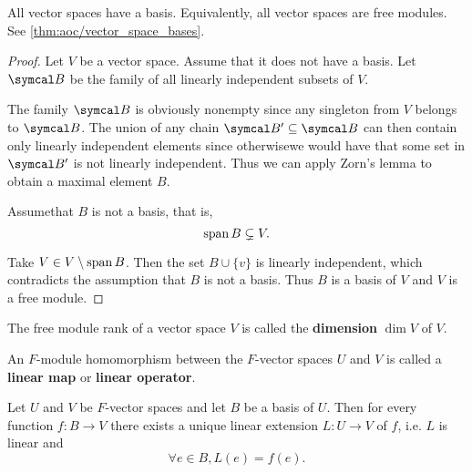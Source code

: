 \begin{theorem}\label{thm:all_vector_spaces_are_free_modules}
  All vector spaces have a basis. Equivalently, all vector spaces are free modules. See \cref{thm:aoc/vector_space_bases}.
\end{theorem}
\begin{proof}
  Let \( V \) be a vector space. Assume that it does not have a basis. Let \( \Cal{B} \) be the family of all linearly independent subsets of \( V \).

  The family \( \Cal{B} \) is obviously nonempty since any singleton from \( V \) belongs to \( \Cal{B} \). The union of any chain \( \Cal{B}' \subseteq \Cal{B} \) can then contain only linearly independent elements since otherwise\LEM we would have that some set in \( \Cal{B}' \) is not linearly independent. Thus we can apply Zorn's lemma to obtain a maximal element \( B \).

  Assume\LEM that \( B \) is not a basis, that is,
  \begin{equation*}
    \operatorname{span} B \subsetneq V.
  \end{equation*}

  Take \( V \in V \setminus \operatorname{span} B \). Then the set \( B \cup \{ v \} \) is linearly independent, which contradicts the assumption that \( B \) is not a basis. Thus \( B \) is a basis of \( V \) and \( V \) is a free module.
\end{proof}

\begin{definition}\label{def:vector_space_dimension}
  The free module rank of a vector space \( V \) is called the \textbf{dimension} \( \dim V \) of \( V \).
\end{definition}

\begin{definition}\label{def:linear_operator}
  An \( F \)-module homomorphism between the \( F \)-vector spaces \( U \) and \( V \) is called a \textbf{linear map} or \textbf{linear operator}.
\end{definition}

\begin{proposition}\label{thm:linear_operator_iff_function_on_basis}
  Let \( U \) and \( V \) be \( F \)-vector spaces and let \( B \) be a basis of \( U \). Then for every function \( f: B \to V \) there exists a unique linear extension \( L: U \to V \) of \( f \), i.e. \( L \) is linear and
  \begin{equation*}
    \forall e \in B, L(e) = f(e).
  \end{equation*}
\end{proposition}
